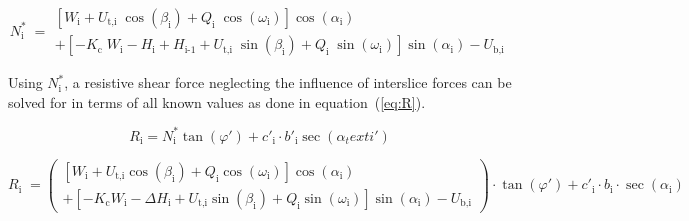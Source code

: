 \documentclass[12pt]{article}
\begin{document}
\begin{equation} \label{eq:N*}
 N^*_{\text{i}} \; = \begin{array}{l}
   \left[ W_{\text{i}} +
     {U_{\text{t,i}}}\;{\cos\left(\beta_{\text{i}}\right)} +
     Q_{\text{i}}\;{\cos\left(\omega_{\text{i}}\right)}
     \right]\cos\left(\alpha_{\text{i}}\right) \\ + \left[
     {-K_{\text{c}}}\;{W_{\text{i}}}- H_{\text{i}} + H_{\text{i-1}} +
     {U_{\text{t,i}}}\;{\sin\left(\beta_{\text{i}}\right)} +
     Q_{\text{i}}\;{\sin\left(\omega_{\text{i}}\right)}
     \right]\sin\left(\alpha_{\text{i}}\right) -
   U_{\text{b,i}} \end{array}
\end{equation}

\noindent
Using $N^*_\text{i}$, a resistive shear force neglecting the influence
of interslice forces can be solved for in terms of all known values as
done in equation~(\ref{eq:R}).

\begin{equation*}
R_\text{i} = N^*_\text{i} \tan\left(\varphi'\right) + c'_\text{i}
\cdot b'_\text{i} \sec\left(\alpha_text{i}'\right)
\end{equation*}

\begin{equation}\label{eq:R}   R_{\text{i}} \; =
  \left( \begin{array}{l} \left[ W_{\text{i}} + U_{\text{t,i}}
      \cos\left(\beta_{\text{i}}\right) + Q_{\text{i}}
      \cos\left(\omega_{\text{i}}\right) \right]
    \cos\left(\alpha_{\text{i}}\right) \\ + \left[ - K_{\text{c}}
      W_{\text{i}} - \Delta H_{\text{i}} + U_{\text{t,i}}
      \sin\left(\beta_{\text{i}}\right) + Q_{\text{i}}
      \sin\left(\omega_{\text{i}}\right) \right]
    \sin\left(\alpha_{\text{i}}\right) - U_{\text{b,i}} \end{array}
  \right) \cdot \tan\left(\varphi'\right) + c'_{\text{i}} \cdot
  b_{\text{i}} \cdot \sec\left(\alpha_{\text{i}}\right)
 \end{equation}

~\newline

\end{document}
